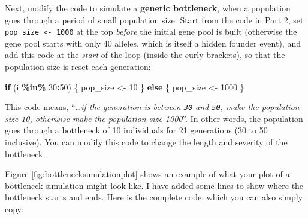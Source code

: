 \documentclass[
  a4paper]{book}
\newenvironment{Shaded}{\begin{snugshade}}{\end{snugshade}}
\newcommand{\ControlFlowTok}[1]{\textcolor[rgb]{0.13,0.29,0.53}{\textbf{#1}}}
\newcommand{\DecValTok}[1]{\textcolor[rgb]{0.00,0.00,0.81}{#1}}
\newcommand{\NormalTok}[1]{#1}
\newcommand{\OtherTok}[1]{\textcolor[rgb]{0.56,0.35,0.01}{#1}}
\newcommand{\SpecialCharTok}[1]{\textcolor[rgb]{0.81,0.36,0.00}{\textbf{#1}}}
\begin{document}
Next, modify the code to simulate a \textbf{genetic bottleneck}, when a population goes through a period of small population size. Start from the code in Part 2, set \texttt{pop\_size\ \textless{}-\ 1000} at the top \emph{before} the initial gene pool is built (otherwise the gene pool starts with only 40 alleles, which is itself a hidden founder event), and add this code at the \emph{start} of the loop (inside the curly brackets), so that the population size is reset each generation:

\begin{Shaded}
\begin{Highlighting}[]
\ControlFlowTok{if}\NormalTok{ (i }\SpecialCharTok{\%in\%} \DecValTok{30}\SpecialCharTok{:}\DecValTok{50}\NormalTok{) \{}
\NormalTok{  pop\_size }\OtherTok{\textless{}{-}} \DecValTok{10}
\NormalTok{\} }\ControlFlowTok{else}\NormalTok{ \{}
\NormalTok{  pop\_size }\OtherTok{\textless{}{-}} \DecValTok{1000}
\NormalTok{\}}
\end{Highlighting}
\end{Shaded}

This code means, ``\emph{\ldots if the generation is between \texttt{30} and \texttt{50}, make the population size 10, otherwise make the population size 1000}''. In other words, the population goes through a bottleneck of 10 individuals for 21 generations (30 to 50 inclusive). You can modify this code to change the length and severity of the bottleneck.

Figure \ref{fig:bottlenecksimulationplot} shows an example of what your plot of a bottleneck simulation might look like. I have added some lines to show where the bottleneck starts and ends. Here is the complete code, which you can also simply copy:
\end{document}
